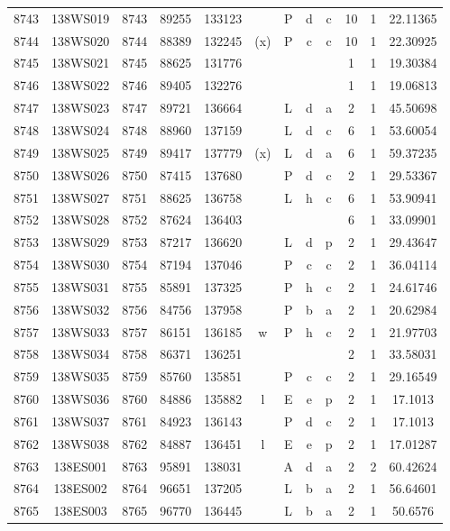 \begin{tabular}{|*{12}{c|}}
8743 & 138WS019 & 8743 & 89255 & 133123 &  & P & d & c & 10 & 1 & 22.11365 \\ 
8744 & 138WS020 & 8744 & 88389 & 132245 & (x) & P & c & c & 10 & 1 & 22.30925 \\ 
8745 & 138WS021 & 8745 & 88625 & 131776 &  &  &  &  & 1 & 1 & 19.30384 \\ 
8746 & 138WS022 & 8746 & 89405 & 132276 &  &  &  &  & 1 & 1 & 19.06813 \\ 
8747 & 138WS023 & 8747 & 89721 & 136664 &  & L & d & a & 2 & 1 & 45.50698 \\ 
8748 & 138WS024 & 8748 & 88960 & 137159 &  & L & d & c & 6 & 1 & 53.60054 \\ 
8749 & 138WS025 & 8749 & 89417 & 137779 & (x) & L & d & a & 6 & 1 & 59.37235 \\ 
8750 & 138WS026 & 8750 & 87415 & 137680 &  & P & d & c & 2 & 1 & 29.53367 \\ 
8751 & 138WS027 & 8751 & 88625 & 136758 &  & L & h & c & 6 & 1 & 53.90941 \\ 
8752 & 138WS028 & 8752 & 87624 & 136403 &  &  &  &  & 6 & 1 & 33.09901 \\ 
8753 & 138WS029 & 8753 & 87217 & 136620 &  & L & d & p & 2 & 1 & 29.43647 \\ 
8754 & 138WS030 & 8754 & 87194 & 137046 &  & P & c & c & 2 & 1 & 36.04114 \\ 
8755 & 138WS031 & 8755 & 85891 & 137325 &  & P & h & c & 2 & 1 & 24.61746 \\ 
8756 & 138WS032 & 8756 & 84756 & 137958 &  & P & b & a & 2 & 1 & 20.62984 \\ 
8757 & 138WS033 & 8757 & 86151 & 136185 & w & P & h & c & 2 & 1 & 21.97703 \\ 
8758 & 138WS034 & 8758 & 86371 & 136251 &  &  &  &  & 2 & 1 & 33.58031 \\ 
8759 & 138WS035 & 8759 & 85760 & 135851 &  & P & c & c & 2 & 1 & 29.16549 \\ 
8760 & 138WS036 & 8760 & 84886 & 135882 & l & E & e & p & 2 & 1 & 17.1013 \\ 
8761 & 138WS037 & 8761 & 84923 & 136143 &  & P & d & c & 2 & 1 & 17.1013 \\ 
8762 & 138WS038 & 8762 & 84887 & 136451 & l & E & e & p & 2 & 1 & 17.01287 \\ 
8763 & 138ES001 & 8763 & 95891 & 138031 &  & A & d & a & 2 & 2 & 60.42624 \\ 
8764 & 138ES002 & 8764 & 96651 & 137205 &  & L & b & a & 2 & 1 & 56.64601 \\ 
8765 & 138ES003 & 8765 & 96770 & 136445 &  & L & b & a & 2 & 1 & 50.6576 \\ 

\end{tabular}
